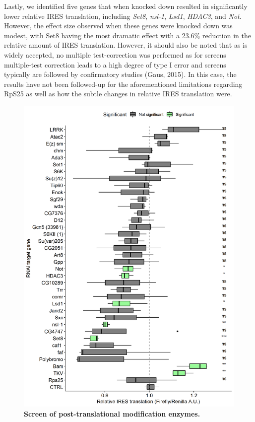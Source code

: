 \documentclass[12pt,oneside]{reedthesis}
\begin{document}
Lastly, we identified five genes that when knocked down resulted in
significantly lower relative IRES translation, including \emph{Set8},
\emph{nsl-1}, \emph{Lsd1}, \emph{HDAC3}, and \emph{Not}. However, the effect size observed
when these genes were knocked down was modest, with Set8 having the most
dramatic effect with a 23.6\% reduction in the relative amount of IRES
translation. However, it should also be noted that as is widely
accepted, no multiple test-correction was performed as for screens
multiple-test correction leads to a high degree of type I error and
screens typically are followed by confirmatory studies
(Gaus, 2015). In this case, the
results have not been followed-up for the aforementioned limitations
regarding RpS25 as well as how the subtle changes in relative IRES
translation were.
\begin{figure}

{\centering \includegraphics[width=0.95\linewidth]{./figure/Screen/IRES_screen} 

}

\caption[\textbf{Screen of post-translational modification enzymes.}]{\textbf{Screen of post-translational modification enzymes.}}\label{fig:Screen-fig-2}
\end{figure}
\end{document}
